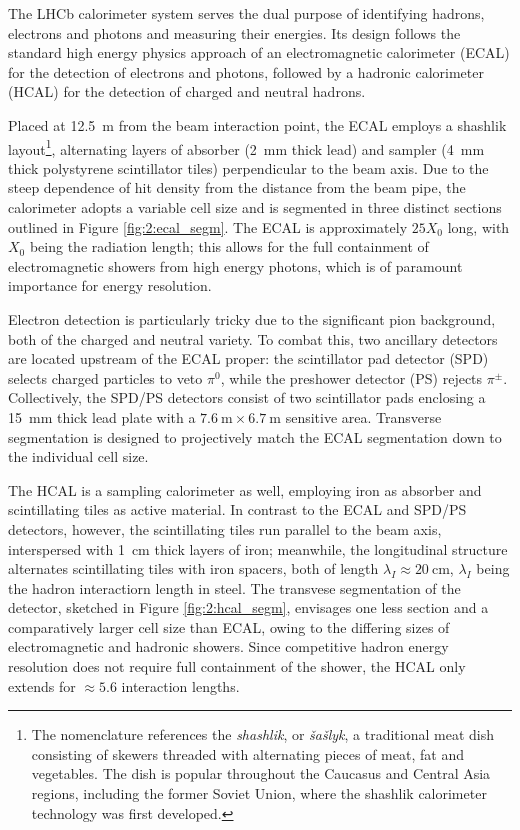The LHCb calorimeter system \cite{Amato:494264} serves the dual purpose of identifying hadrons, electrons and photons and measuring their energies.
Its design follows the standard high energy physics approach of an electromagnetic calorimeter (ECAL) for the detection of electrons and photons, followed by a hadronic calorimeter (HCAL) for the detection of charged and neutral hadrons.

Placed at \SI{12.5}{\meter} from the beam interaction point, the ECAL employs a shashlik layout\footnote{The nomenclature references the \textit{shashlik}, or \textit{šašlyk}, a traditional meat dish consisting of skewers threaded with alternating pieces of meat, fat and vegetables. The dish is popular throughout the Caucasus and Central Asia regions, including the former Soviet Union, where the shashlik calorimeter technology was first developed.}, alternating layers of absorber (\SI{2}{\milli\meter} thick lead) and sampler (\SI{4}{\milli\meter} thick polystyrene scintillator tiles) perpendicular to the beam axis.
Due to the steep dependence of hit density from the distance from the beam pipe, the calorimeter adopts a variable cell size and is segmented in three distinct sections outlined in Figure \ref{fig:2:ecal_segm}.
The ECAL is approximately $25X_0$ long, with $X_0$ being the radiation length; this allows for the full containment of electromagnetic showers from high energy photons, which is of paramount importance for energy resolution.

Electron detection is particularly tricky due to the significant pion background, both of the charged and neutral variety.
To combat this, two ancillary detectors are located upstream of the ECAL proper: the scintillator pad detector (SPD) selects charged particles to veto $\pi^0$, while the preshower detector (PS) rejects $\pi^\pm$.
Collectively, the SPD/PS detectors consist of two scintillator pads enclosing a \SI{15}{\milli\meter} thick lead plate with a $\SI{7.6}{\meter} \times \SI{6.7}{\meter}$ sensitive area.
Transverse segmentation is designed to projectively match the ECAL segmentation down to the individual cell size.

The HCAL is a sampling calorimeter as well, employing iron as absorber and scintillating tiles as active material.
In contrast to the ECAL and SPD/PS detectors, however, the scintillating tiles run parallel to the beam axis, interspersed with \SI{1}{\centi\meter} thick layers of iron;
meanwhile, the longitudinal structure alternates scintillating tiles with iron spacers, both of length $\lambda_I \approx \SI{20}{\centi\meter}$, $\lambda_I$ being the hadron interactiorn length in steel.
The transvese segmentation of the detector, sketched in Figure \ref{fig:2:hcal_segm}, envisages one less section and a comparatively larger cell size than ECAL, owing to the differing sizes of electromagnetic and hadronic showers.
Since competitive hadron energy resolution does not require full containment of the shower, the HCAL only extends for $\approx 5.6$ interaction lengths.

